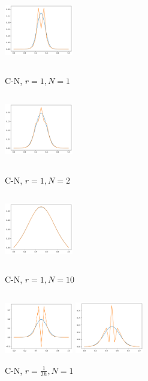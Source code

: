\documentclass{ctexart}
\begin{document}
\begin{figure}[htbp]
	\begin{minipage}{5cm}
		\centering
		\includegraphics[width = 3cm, height = 3cm]{1-1-1.png}
		\caption{C-N, $r=1,N=1$}
		\label{CN1}
	\end{minipage}
	\begin{minipage}{5cm}
		\centering
		\includegraphics[width = 3cm, height = 3cm]{1-1-2.png}
		\caption{C-N, $r=1,N=2$}
		\label{CN2}
	\end{minipage}
	\begin{minipage}{5cm}
		\centering
		\includegraphics[width = 3cm, height = 3cm]{1-1-3.png}
		\caption{C-N, $r=1,N=10$}
		\label{CN3}
	\end{minipage}
	\begin{minipage}{5cm}
		\centering
		\includegraphics[width = 3cm, height = 3cm]{1-2-1.png}
		\caption{C-N, $r=\frac 1{2h},N=1$}
		\label{CN4}
	\end{minipage}
	\begin{minipage}{5cm}
		\centering
		\includegraphics[width = 3cm, height = 3cm]{1-2-2.png}

\end{minipage}
\end{figure}
\end{document}

